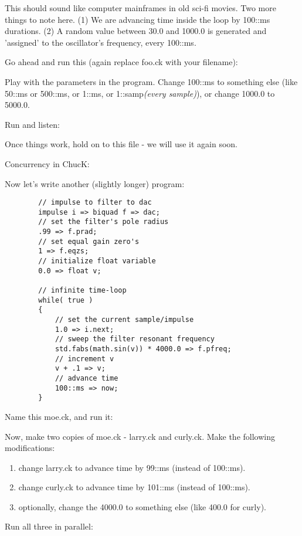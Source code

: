 This should sound like computer mainframes in old sci-fi movies. Two more things to note here. (1) We are advancing time inside the loop by 100::ms durations. (2) A random value between 30.0 and 1000.0 is generated and 'assigned' to the oscillator's frequency, every 100::ms. 

Go ahead and run this (again replace foo.ck with your filename):

Play with the parameters in the program. Change 100::ms to something else (like 50::ms or 500::ms, or 1::ms, or 1::samp\textit{(every sample)}), or change 1000.0 to 5000.0. 

Run and listen:

Once things work, hold on to this file - we will use it again soon. 

Concurrency in ChucK: 

Now let's write another (slightly longer) program:
\begin{verbatim}
        // impulse to filter to dac
        impulse i => biquad f => dac;
        // set the filter's pole radius
        .99 => f.prad;
        // set equal gain zero's
        1 => f.eqzs;
        // initialize float variable
        0.0 => float v;

        // infinite time-loop
        while( true )
        {
            // set the current sample/impulse
            1.0 => i.next;
            // sweep the filter resonant frequency
            std.fabs(math.sin(v)) * 4000.0 => f.pfreq;
            // increment v
            v + .1 => v;
            // advance time
            100::ms => now;
        }
\end{verbatim}

Name this moe.ck, and run it:

Now, make two copies of moe.ck - larry.ck and curly.ck. Make the following modifications:
\begin{enumerate}
\item change larry.ck to advance time by 99::ms (instead of 100::ms).
\item change curly.ck to advance time by 101::ms (instead of 100::ms). 
\item optionally, change the 4000.0 to something else (like 400.0 for curly). 
\end{enumerate}

Run all three in parallel:

